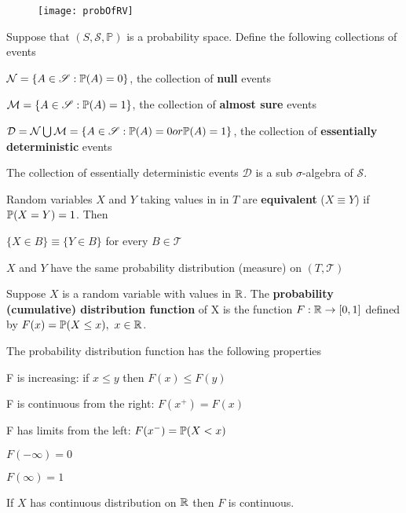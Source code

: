 \begin{figure}[ht]
\texttt{[image: probOfRV]}
\centering
\end{figure}

\begin{definition}
Suppose that $(S, \mathscr{S}, \mathbb{P})$ is a probability space. 
Define the following collections of events
\begin{compactitem}
\item $\mathcal{N} = \{A \in \mathscr{S} : \mathbb{P}(A) = 0\}$, the collection of \textbf{null} events
\item $\mathcal{M} = \{A \in \mathscr{S} : \mathbb{P}(A) = 1\}$, the collection of \textbf{almost sure} events
\item $\mathcal{D} = \mathcal{N} \bigcup \mathcal{M} = \{A \in \mathscr{S} : \mathbb{P}(A) = 0 or \mathbb{P}(A) = 1\}$, the collection of \textbf{essentially deterministic} events
\end{compactitem}
The collection of essentially deterministic events $\mathcal{D}$ is a sub $\sigma$-algebra of $\mathscr{S}$.
\end{definition}

\begin{definition}
Random variables $X$ and $Y$ taking values in in $T$ are \textbf{equivalent} ($X \equiv Y$) if $\mathbb{P}(X = Y) = 1$. Then
\begin{compactitem}
\item $\{X \in B\} \equiv \{Y \in B\}$ for every $B \in \mathscr{T}$
\item $X$ and $Y$ have the same probability distribution (measure) on $(T, \mathscr{T})$
\end{compactitem}
\end{definition}

\begin{definition}\label{defpre:probabilityDistributionFunc}
Suppose $X$ is a random variable with values in $\mathbb{R}$. The \textbf{probability (cumulative) distribution function} of X is the function $F : \mathbb{R} \to [0,1]$ defined by $F(x) = \mathbb{P}(X \leq x), \ x \in \mathbb{R}$.
\end{definition}

The probability distribution function has the following properties
\begin{compactitem}
\item F is increasing: if $x \leq y$ then $F(x) \leq F(y)$
\item F is continuous from the right: $F(x^+) = F(x)$
\item F has limits from the left: $F(x^-) = \mathbb{P}(X < x)$
\item $F(-\infty) = 0$
\item $F(\infty) = 1$
\item If $X$ has continuous distribution on $\mathbb{R}$ then $F$ is continuous.
\end{compactitem}

